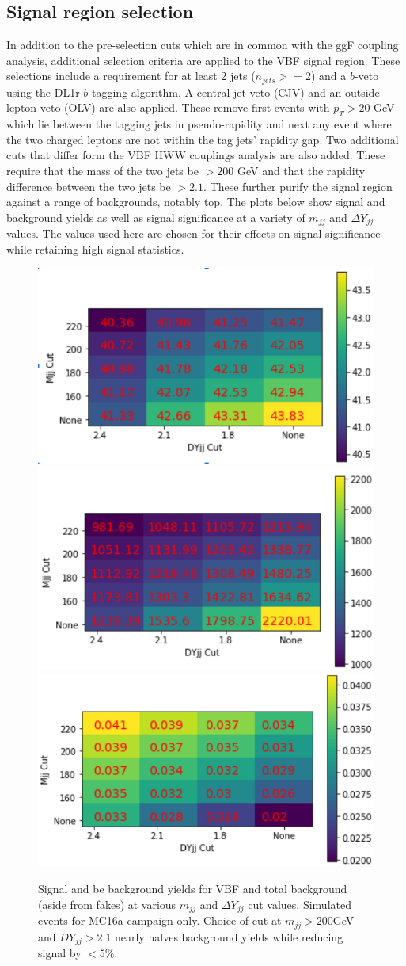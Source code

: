 \subsection{Signal region selection}
In addition to the pre-selection cuts which are in common with the ggF coupling analysis, additional selection criteria are applied to the VBF signal region. These selections include a requirement for at least 2 jets ($n_{jets}>=2$) and a $b$-veto using the DL1r $b$-tagging algorithm. A central-jet-veto (CJV) and an outside-lepton-veto (OLV) are also applied. These remove first events with $p_T >20$ GeV which lie between the tagging jets in pseudo-rapidity and next any event where the two charged leptons are not within the tag jets' rapidity gap. Two additional cuts that differ form the VBF HWW couplings analysis are also added. These require that the mass of the two jets be $>200$ GeV and that the rapidity difference between the two jets be $>2.1$. These further purify the signal region against a range of backgrounds, notably top. The plots below show signal and background yields as well as signal significance at a variety of $m_{jj}$ and $\Delta Y_{jj}$ values. The values used here are chosen for their effects on signal significance while retaining high signal statistics. 

\begin{figure}[!htbp]
\centering
\includegraphics[width=.3\linewidth]{Pictures/MjjDYjjVBF.png}
\includegraphics[width=.3\linewidth]{Pictures/MjjDYjjBackground.png}
\includegraphics[width=.3\linewidth]{Pictures/MjjDYjjSig.png}
\caption{Signal and be background yields for VBF and total background (aside from fakes) at various $m_{jj}$ and $\Delta Y_{jj}$ cut values. Simulated events for MC16a campaign only. Choice of cut at $m_{jj}>200$GeV and $DY_{jj}>2.1$ nearly halves background yields while reducing signal by $<5\%$.}
\label{fig:MjjDYjjSig}
\end{figure}

